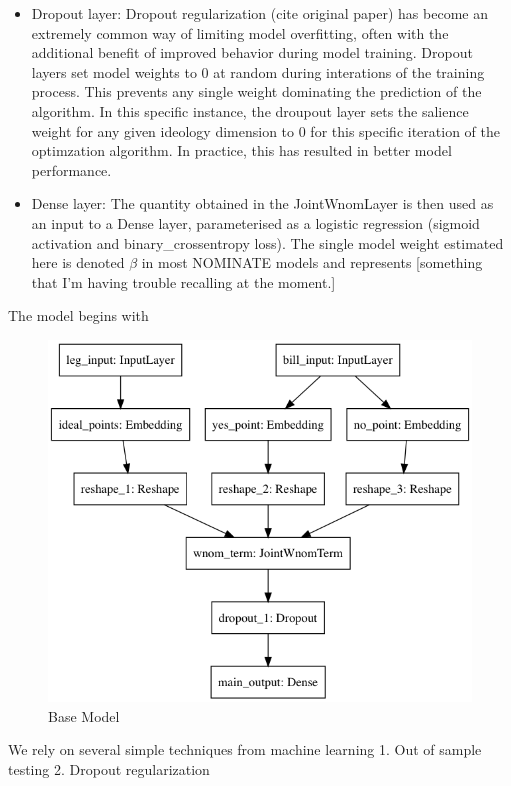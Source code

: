 \documentclass[11pt,]{article}
\begin{document}
\begin{itemize}
\item
  Dropout layer: Dropout regularization (cite original paper) has become
  an extremely common way of limiting model overfitting, often with the
  additional benefit of improved behavior during model training. Dropout
  layers set model weights to 0 at random during interations of the
  training process. This prevents any single weight dominating the
  prediction of the algorithm. In this specific instance, the droupout
  layer sets the salience weight for any given ideology dimension to 0
  for this specific iteration of the optimzation algorithm. In practice,
  this has resulted in better model performance.
\item
  Dense layer: The quantity obtained in the JointWnomLayer is then used
  as an input to a Dense layer, parameterised as a logistic regression
  (sigmoid activation and binary\_crossentropy loss). The single model
  weight estimated here is denoted \(\beta\) in most NOMINATE models and
  represents {[}something that I'm having trouble recalling at the
  moment.{]}
\end{itemize}

The model begins with

\begin{figure}

{\centering \includegraphics[width=0.75\linewidth]{model} 

}

\caption{\label{fig:model1}Base Model}\label{fig:unnamed-chunk-2}
\end{figure}

We rely on several simple techniques from machine learning 1. Out of
sample testing 2. Dropout regularization
\end{document}
